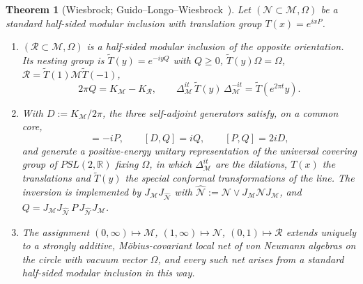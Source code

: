 \documentclass[a4paper,11pt]{article}
\newtheorem{theorem}{Theorem}
\theoremstyle{definition}
\newcommand{\mR}{\mathcal{R}}
\newcommand{\mN}{\mathcal{N}}
\newcommand{\mM}{\mathcal{M}}
\begin{document}
\begin{theorem}[Wiesbrock; Guido--Longo--Wiesbrock~{\cite{Wiesbrock1993b,GuidoLongoWiesbrock1998}}]\label{thm:wiesbrock-PSL}
Let $(\mN\subset\mM,\Omega)$ be a standard half-sided modular inclusion with translation group $T(x)=e^{ixP}$.
\begin{enumerate}
 \item[\rm(i)] $(\mR\subset\mM,\Omega)$ is a half-sided modular inclusion of the opposite orientation. Its nesting group is $\widetilde T(y)=e^{-iyQ}$ with $Q\ge0$, $\widetilde T(y)\Omega=\Omega$, $\mR=\widetilde T(1)\mM\widetilde T(-1)$,
 \begin{equation}
  2\pi Q=K_{\mM}-K_{\mR},
  \qquad
  \Delta_{\mM}^{it}\,\widetilde T(y)\,\Delta_{\mM}^{-it}=\widetilde T(e^{2\pi t}y).
  \label{eq:HSMI-Q}
 \end{equation}
 \item[\rm(ii)] With $D:=K_{\mM}/2\pi$, the three self-adjoint generators satisfy, on a common core,
 \begin{equation}
  [D,P]=-iP,\qquad [D,Q]=iQ,\qquad [P,Q]=2iD,
  \label{eq:sl2-relations}
 \end{equation}
 and generate a positive-energy unitary representation of the universal covering group of $PSL(2,\mathbb R)$ fixing $\Omega$, in which $\Delta_{\mM}^{it}$ are the dilations, $T(x)$ the translations and $\widetilde T(y)$ the special conformal transformations of the line. The inversion is implemented by $J_{\mM}J_{\widehat{\mN}}$ with $\widehat{\mN}:=\mN\vee J_{\mM}\mN J_{\mM}$, and $Q=J_{\mM}J_{\widehat{\mN}}\,P\,J_{\widehat{\mN}}J_{\mM}$.
 \item[\rm(iii)] The assignment $(0,\infty)\mapsto\mM$, $(1,\infty)\mapsto\mN$, $(0,1)\mapsto\mR$ extends uniquely to a strongly additive, M\"obius-covariant local net of von Neumann algebras on the circle with vacuum vector $\Omega$, and every such net arises from a standard half-sided modular inclusion in this way.
\end{enumerate}
\end{theorem}
\end{document}
